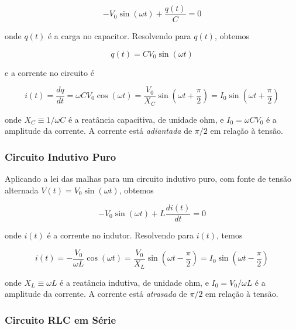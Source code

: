 \documentclass[12pt]{article}
\begin{document}
\begin{equation}
    - V_0 \sin(\omega t) + \frac{q(t)}{C} = 0
\end{equation}

\noindent onde \(q(t)\) é a carga no capacitor. Resolvendo para \(q(t)\), obtemos

\begin{equation}
    \boxed{q(t) = C V_0 \sin(\omega t)}
\end{equation}

\noindent e a corrente no circuito é

\begin{equation}
    \boxed{i(t) = \frac{dq}{dt} = \omega C V_0 \cos(\omega t) = \frac{V_0}{X_C} \sin\left(\omega t + \frac{\pi}{2}\right) = I_0 \sin\left(\omega t + \frac{\pi}{2}\right)}
\end{equation}

\noindent onde \(\displaystyle X_C \equiv 1/\omega C\) é a reatância capacitiva, de unidade ohm, e \(I_0 = \omega C V_0\) é a amplitude da corrente. A corrente está \emph{adiantada} de \(\pi/2\) em relação à tensão.

\subsubsection{Circuito Indutivo Puro}

Aplicando a lei das malhas para um circuito indutivo puro, com fonte de tensão alternada \(V(t) = V_0 \sin(\omega t)\), obtemos

\begin{equation}
    - V_0 \sin(\omega t) + L \frac{di(t)}{dt} = 0
\end{equation}

\noindent onde \(i(t)\) é a corrente no indutor. Resolvendo para \(i(t)\), temos

\begin{equation}
    \boxed{i(t) = -\frac{V_0}{\omega L} \cos(\omega t) = \frac{V_0}{X_L} \sin\left(\omega t - \frac{\pi}{2}\right) = I_0 \sin\left(\omega t - \frac{\pi}{2}\right)}
\end{equation}

\noindent onde \(\displaystyle X_L \equiv \omega L\) é a reatância indutiva, de unidade ohm, e \(I_0 = V_0/\omega L\) é a amplitude da corrente. A corrente está \emph{atrasada} de \(\pi/2\) em relação à tensão.

\subsubsection{Circuito RLC em Série}
\end{document}
